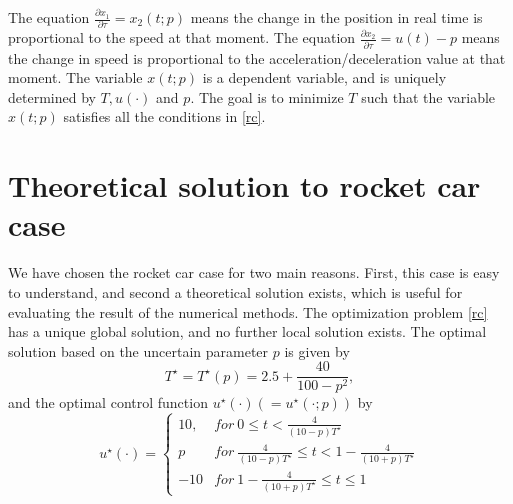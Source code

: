 \documentclass  [
  paper    = a4,
  BCOR     = 10mm,
  twoside,
  fontsize = 12pt,
  fleqn,
  toc      = bibnumbered,
  toc      = listofnumbered,
  numbers  = noendperiod,
  headings = normal,
  listof   = leveldown,
  version  = 3.03
]                                       {scrreprt}
\newcommand{\<}{\langle}
\renewcommand{\>}{\rangle}
\begin{document}
The equation $\frac{\partial x_1}{\partial \tau}= x_2(t;p) $ means the change in the position in real time is proportional to the speed at that moment. The equation $\frac{\partial x_2}{\partial \tau} = u(t)-p $ means the change in speed is proportional to the acceleration/deceleration value at that moment. 
The variable $x(t;p)$ is a dependent variable, and is uniquely determined by $T, u(\cdot)$ and $p$. The goal is to minimize $T$ such that the variable $x(t;p)$ satisfies all the conditions in \ref{rc}. 

\section{Theoretical solution to rocket car case}
 We have chosen the rocket car case for two main reasons. First, this case is easy to understand, and second a theoretical solution exists, which is useful for evaluating the result of the numerical methods. 
The optimization problem \ref{rc} has a unique global solution, and no further local solution exists. The optimal solution based on the uncertain parameter $p$ is given by 
\begin{equation}
	T^\star = T^\star(p) = 2.5 + \frac{40}{100-p^2},
	\label{eq_Theory_T}
\end{equation}
and the optimal control function $u^\star(\cdot) (= u^\star(\cdot; p))$ by 
\begin{equation}
	u^\star(\cdot) =     \left\{
	\begin{array}{ll}
		10, & for \  0 \leq t <  \frac{4}{(10-p)T^\star}\\
		p  &  for \ \frac{4}{(10-p)T^\star} \leq t < 1- \frac{4}{(10+p)T^\star} \\
		-10  & for \  1- \frac{4}{(10+p)T^\star} \leq t \leq 1 
	\end{array}
	\right.
	\label{eq_Theory_u}
\end{equation}
\end{document}
